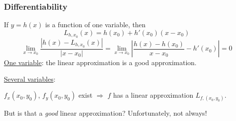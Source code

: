 \begin{frame}
\frametitle{Differentiability}

If $y=h(x)$ is a function of one variable, then
%
$$L_{h,x_0}(x) = h(x_0) + h'(x_0) (x-x_0)$$
%
$$
  \lim_{x\to x_0} \frac{|h(x)-L_{h,x_0}(x)|}{|x-x_0|} = \lim_{x \to x_0} \left| \frac{h(x)-h(x_0)}{x-x_0} -h'(x_0) \right| = 0
$$
%
\pause \underline{One variable}: the linear approximation is a good approximation.

\pause \underline{Several variables}:

$f_x(x_0,y_0)$, $f_y(x_0,y_0)$ exist $\Longrightarrow$
$f$ has a linear approximation $L_{f, (x_0,y_0)}$.

But is that a \emph{good} linear approximation? \pause
Unfortunately, \textcolor[rgb]{0.98,0.00,0.00}{not always}!
\end{frame}
